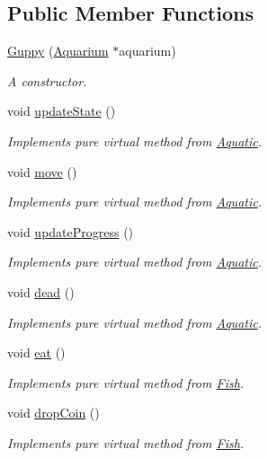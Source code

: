 \subsection*{Public Member Functions}
\begin{DoxyCompactItemize}
\item 
\mbox{\hyperlink{class_guppy_a6c371372fd43565bf663ec29631d1daa}{Guppy}} (\mbox{\hyperlink{class_aquarium}{Aquarium}} $\ast$aquarium)
\begin{DoxyCompactList}\small\item\em A constructor. \end{DoxyCompactList}\item 
void \mbox{\hyperlink{class_guppy_ac62ef7053d40430ad98c1d5a54699f9d}{update\+State}} ()
\begin{DoxyCompactList}\small\item\em Implements pure virtual method from \mbox{\hyperlink{class_aquatic}{Aquatic}}. \end{DoxyCompactList}\item 
void \mbox{\hyperlink{class_guppy_ae6002948d74b3741bed34a7311be4377}{move}} ()
\begin{DoxyCompactList}\small\item\em Implements pure virtual method from \mbox{\hyperlink{class_aquatic}{Aquatic}}. \end{DoxyCompactList}\item 
void \mbox{\hyperlink{class_guppy_af22eacc4a1ea7bec4be7b5d82148407b}{update\+Progress}} ()
\begin{DoxyCompactList}\small\item\em Implements pure virtual method from \mbox{\hyperlink{class_aquatic}{Aquatic}}. \end{DoxyCompactList}\item 
void \mbox{\hyperlink{class_guppy_abcdcd74d4c3fdddfc5cc0439c0e512b7}{dead}} ()
\begin{DoxyCompactList}\small\item\em Implements pure virtual method from \mbox{\hyperlink{class_aquatic}{Aquatic}}. \end{DoxyCompactList}\item 
void \mbox{\hyperlink{class_guppy_afe934262a0988e4ad041f4ed3a1a7e02}{eat}} ()
\begin{DoxyCompactList}\small\item\em Implements pure virtual method from \mbox{\hyperlink{class_fish}{Fish}}. \end{DoxyCompactList}\item 
void \mbox{\hyperlink{class_guppy_a356d1f45f52684bba3e6e9e7774e59b8}{drop\+Coin}} ()
\begin{DoxyCompactList}\small\item\em Implements pure virtual method from \mbox{\hyperlink{class_fish}{Fish}}. \end{DoxyCompactList}\end{DoxyCompactItemize}
